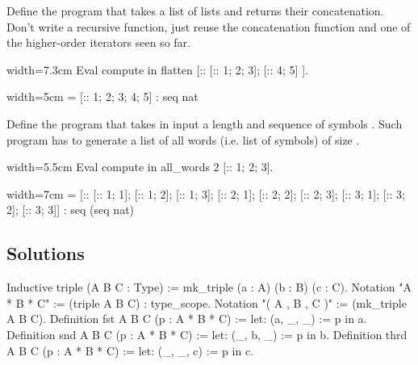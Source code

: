 \begin{Exercise}[label=ex:flatten,difficulty=1,title={List flattening}]
Define the program  that takes a list of lists and returns
their concatenation.  Don't write a recursive function, just reuse
the concatenation function and one of the higher-order iterators
seen so far.

\begin{coq}{}{width=7.3cm}
Eval compute in
  flatten [:: [:: 1; 2; 3]; [:: 4; 5] ].
\end{coq}
\begin{coqout}{}{width=5cm}
 = [:: 1; 2; 3; 4; 5]
 : seq nat
\end{coqout}
\end{Exercise}


\begin{Exercise}[label=ex:allwords,difficulty=2,title={All words of size n}]
Define the  program that takes in input a
length  and sequence of symbols .
Such program has to generate a list of all words (i.e. list
of symbols) of size .

\begin{coq}{}{width=5.5cm}
Eval compute in
  all_words 2 [:: 1; 2; 3].
$~$
$~$
\end{coq}
\begin{coqout}{}{width=7cm}
 = [:: [:: 1; 1]; [:: 1; 2]; [:: 1; 3];
       [:: 2; 1]; [:: 2; 2]; [:: 2; 3];
       [:: 3; 1]; [:: 3; 2]; [:: 3; 3]]
 : seq (seq nat)
\end{coqout}
\end{Exercise}

\subsection{Solutions}


\begin{Answer}[ref=ex:triple]

\begin{coq}{}{}
Inductive triple (A B C : Type) := mk_triple (a : A) (b : B) (c : C).
Notation "A * B * C" := (triple A B C) : type_scope.
Notation "( A , B , C )" := (mk_triple A B C).
Definition fst  A B C (p : A * B * C) := let: (a, _, _) := p in a.
Definition snd  A B C (p : A * B * C) := let: (_, b, _) := p in b.
Definition thrd A B C (p : A * B * C) := let: (_, _, c) := p in c.
\end{coq}

\end{Answer}

